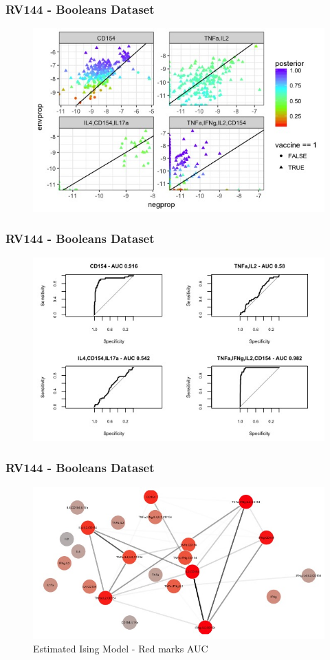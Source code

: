 \documentclass{beamer}
\theoremstyle{definition}
\begin{document}

\begin{frame}
\frametitle{RV144 - Booleans Dataset}
\begin{figure}[]
\includegraphics[width=12 cm]{figures/booleansScatterLess} 
\end{figure}
\end{frame}


\begin{frame}
\frametitle{RV144 - Booleans Dataset}
\begin{figure}[]
\includegraphics[width=12 cm]{figures/BooleansROCless}
\end{figure}
\end{frame}


\begin{frame}
\frametitle{RV144 - Booleans Dataset}
\begin{figure}[]
\includegraphics[width= 10.5 cm]{figures/booleansNetworkAUC} 
\caption{Estimated Ising Model - Red marks AUC}
\end{figure}
\end{frame}
\end{document}
